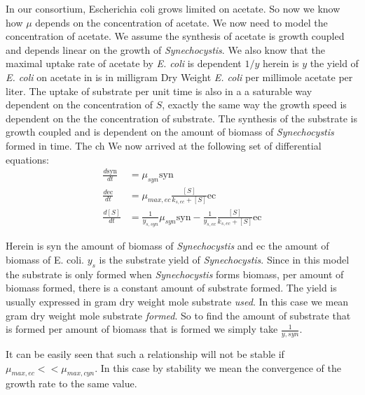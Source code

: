 \documentclass[12pt]{report}
\begin{document}
In our consortium, Escherichia coli grows limited on acetate. So now we know how $\mu$ depends on the concentration of acetate. We now need to model the concentration of acetate. We assume the synthesis of acetate is growth coupled and depends linear on the growth of \textit{Synechocystis}. We also know that the maximal uptake rate of acetate by \textit{E. coli} is dependent $1/y$ herein is $y$ the yield of \textit{E. coli} on acetate in is in milligram Dry Weight \textit{E. coli} per millimole acetate per liter. The uptake of substrate per unit time is also in a a saturable way dependent on the concentration of $S$, exactly the same way the growth speed is dependent on the the concentration of substrate. The synthesis of the substrate is growth coupled  and is dependent on the amount of biomass of \textit{Synechocystis} formed in time. The ch  We now arrived at the following set of differential equations:
\begin{align} \label{eq:ow}
 \frac{d\text{syn}}{dt} &= \mu_{syn}\text{syn} \\
 \frac{d\text{ec}}{dt} &= \mu_{max,ec} \frac{[S]}{k_{s,ec}+[S]} \text{ec} \\
 \frac{d[S]}{dt} &= \frac{1}{y_{s,syn}} \mu_{syn} \text{syn} - \frac{1}{y_{s,ec}} \frac{[S]}{k_{s,ec}+[S]} \text{ec}
\end{align}

Herein is syn the amount of biomass of \textit{Synechocystis} and ec the amount of biomass of E. coli. $y_s$ is the substrate yield of \textit{Synechocystis}. Since in this model the substrate is only formed when \textit{Synechocystis} forms biomass, per amount of biomass formed, there is a constant amount of substrate formed. The yield is usually expressed in gram dry weight mole substrate \emph{used}. In this case we mean gram dry weight mole substrate \emph{formed}. So to find the amount of substrate that is formed per amount of biomass that is formed we simply take $\frac{1}{y,syn}$.

It can be easily seen that such a relationship will not be stable if $\mu_{max,ec}<<\mu_{max,cyn}$. In this case by stability we mean the convergence of the growth rate to the same value.
\end{document}
